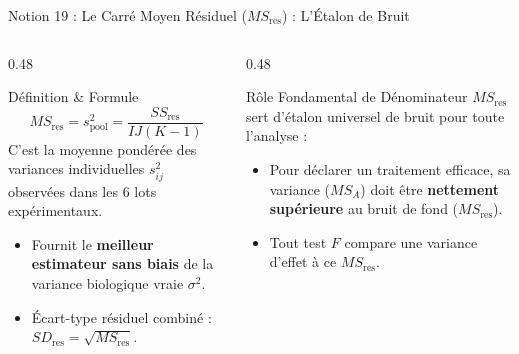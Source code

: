 \documentclass[aspectratio=169,10pt]{beamer}
\begin{document}
\begin{frame}{Notion 19 : Le Carré Moyen Résiduel ($MS_{\text{res}}$) : L'Étalon de Bruit}
  \begin{columns}[onlytextwidth, T]
    \begin{column}{0.48\linewidth}
      \begin{conceptbox}{Définition \& Formule}
        \begin{equation*}
          MS_{\text{res}} = s_{\text{pool}}^2 = \frac{SS_{\text{res}}}{IJ(K - 1)}
        \end{equation*}
        C'est la moyenne pondérée des variances individuelles $s_{ij}^2$ observées dans les 6 lots expérimentaux.
        \begin{itemize}
          \item Fournit le \textbf{meilleur estimateur sans biais} de la variance biologique vraie $\sigma^2$.
          \item Écart-type résiduel combiné : $SD_{\text{res}} = \sqrt{MS_{\text{res}}}$.
        \end{itemize}
      \end{conceptbox}
    \end{column}
    \begin{column}{0.48\linewidth}
      \begin{biobox}{Rôle Fondamental de Dénominateur}
        $MS_{\text{res}}$ sert d'étalon universel de bruit pour toute l'analyse :
        \begin{itemize}
          \item Pour déclarer un traitement efficace, sa variance ($MS_A$) doit être \textbf{nettement supérieure} au bruit de fond ($MS_{\text{res}}$).
          \item Tout test $F$ compare une variance d'effet à ce $MS_{\text{res}}$.
        \end{itemize}
      \end{biobox}
    \end{column}
  \end{columns}
\end{frame}
\end{document}
